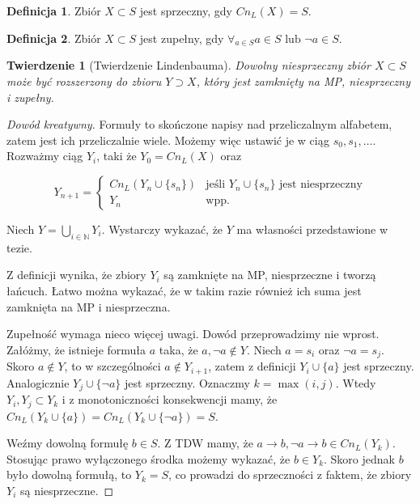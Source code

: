 \documentclass[10pt,a4paper]{article}
\theoremstyle{plain}
\newtheorem{theorem}{Twierdzenie}
\theoremstyle{definition}
\newtheorem*{definition}{Definicja}
\newcommand{\impl}{\rightarrow}
\newcommand{\N}{\mathbb{N}}
\begin{document}
\begin{definition}
Zbiór $X \subset S$ jest sprzeczny, gdy $Cn_L(X) = S$.
\end{definition}

\begin{definition}
Zbiór $X \subset S$ jest zupełny, gdy 
$\forall_{a \in S} a \in S \text{ lub } \neg a \in S$.
\end{definition}

\begin{theorem}[Twierdzenie Lindenbauma]
Dowolny niesprzeczny zbiór $X \subset S$ może być rozszerzony do zbioru
$Y \supset X$, który jest zamknięty na MP, niesprzeczny i zupełny.
\end{theorem}

\begin{proof}[Dowód kreatywny]
Formuły to skończone napisy nad przeliczalnym alfabetem, zatem jest ich
przeliczalnie wiele. Możemy więc ustawić je w ciąg $s_0, s_1, \ldots$. 
Rozważmy ciąg $Y_i$, taki że $Y_0 = Cn_L(X)$ oraz

$$Y_{n+1} = \begin{cases}
  Cn_L(Y_n \cup \{s_n\}) & 
    \text{jeśli } Y_n \cup \{s_n\} \text{ jest niesprzeczny}\\
  Y_n & \text{wpp.}
\end{cases}$$

Niech $Y = \bigcup_{i\in\N} Y_i$. Wystarczy wykazać, że $Y$ ma własności
przedstawione w tezie.

Z definicji wynika, że zbiory $Y_i$ są zamknięte na MP, niesprzeczne 
i tworzą łańcuch. Łatwo można wykazać, że w takim razie również ich
suma jest zamknięta na MP i niesprzeczna.

Zupełność wymaga nieco więcej uwagi. Dowód przeprowadzimy nie wprost.
Załóżmy, że istnieje formuła $a$ taka, że $a, \neg a \not \in Y$.
Niech $a = s_i$ oraz $\neg a = s_j$. Skoro $a \not \in Y$, to
w szczególności $a \not \in Y_{i+1}$, zatem z definicji $Y_i \cup \{a\}$
jest sprzeczny. Analogicznie $Y_j \cup \{\neg a\}$ jest sprzeczny.
Oznaczmy $k=\max(i, j)$. Wtedy $Y_i,Y_j \subset Y_k$ i z monotoniczności
konsekwencji mamy, że $Cn_L(Y_k \cup \{a\}) = Cn_L(Y_k \cup \{\neg a\}) = S$.

Weźmy dowolną formułę $b \in S$. Z TDW mamy, że
$a \impl b, \neg a \impl b \in Cn_L(Y_k)$. Stosując prawo wyłączonego środka
możemy wykazać, że $b \in Y_k$. Skoro jednak $b$ było dowolną formułą, to
$Y_k = S$, co prowadzi do sprzeczności z faktem, że zbiory $Y_i$ są
niesprzeczne.
\end{proof}
\end{document}
